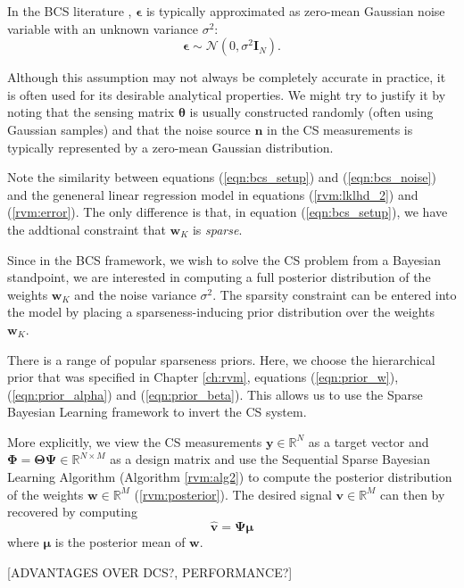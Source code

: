 In the BCS literature \cite{ji2008}, $\bm\epsilon$ is typically approximated as zero-mean Gaussian noise variable with an unknown variance $\sigma^2$:
\begin{equation}
\label{eqn:bcs_noise}
  \bm\epsilon\sim\mathcal{N}(0,\sigma^2\bm I_N).
\end{equation}

Although this assumption may not always be completely accurate in practice, it is often used for its desirable analytical properties.
We might try to justify it by noting that the sensing matrix $\bm\theta$ is usually constructed randomly (often using Gaussian samples) and that the noise source $\bm n$ in the CS measurements is typically represented by a zero-mean Gaussian distribution.

Note the similarity between equations (\ref{eqn:bcs_setup}) and (\ref{eqn:bcs_noise}) and the geneneral linear regression model in equations (\ref{rvm:lklhd_2}) and (\ref{rvm:error}).
The only difference is that, in equation (\ref{eqn:bcs_setup}), we have the addtional constraint that $\bm w_K$ is \emph{sparse}.

Since in the BCS framework, we wish to solve the CS problem from a Bayesian standpoint, we are interested in computing a full posterior distribution of the weights $\bm w_K$ and the noise variance $\sigma^2$.
The sparsity constraint can be entered into the model by placing a sparseness-inducing prior distribution over the weights $\bm w_K$.

There is a range of popular sparseness priors.
Here, we choose the hierarchical prior that was specified in Chapter \ref{ch:rvm}, equations (\ref{eqn:prior_w}), (\ref{eqn:prior_alpha}) and (\ref{eqn:prior_beta}).
This allows us to use the Sparse Bayesian Learning framework to invert the CS system.

More explicitly, we view the CS measurements $\bm y \in \mathbb{R}^N$ as a target vector and $\bm\Phi=\bm\Theta\bm\Psi \in\mathbb{R}^{N\times M}$ as a design matrix and use the Sequential Sparse Bayesian Learning Algorithm (Algorithm \ref{rvm:alg2}) to compute the posterior distribution of the weights $\bm w \in \mathbb{R}^M$ (\ref{rvm:posterior}).
The desired signal $\bm v\in\mathbb{R}^M$ can then by recovered by computing 
\begin{equation}
  \label{eqn:bcs_recover}
  \bm{\hat v} = \bm\Psi\bm\mu
\end{equation} 
where $\bm \mu$ is the posterior mean of $\bm w$.

[ADVANTAGES OVER DCS?, PERFORMANCE?]


